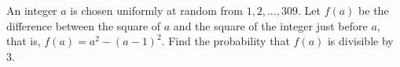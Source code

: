 An integer $a$ is chosen uniformly at random from $1,2,\dots,309$. Let $f(a)$ be the difference between the square of $a$ and the square of the integer just before $a$, that is, $f(a)=a^2-(a-1)^2$. Find the probability that $f(a)$ is divisible by $3$.

